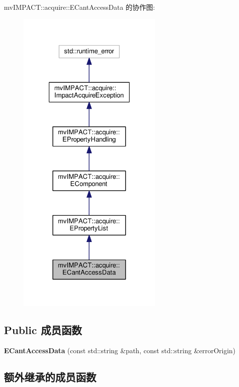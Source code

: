 mv\+I\+M\+P\+A\+C\+T\+:\+:acquire\+:\+:E\+Cant\+Access\+Data 的协作图\+:
\nopagebreak
\begin{figure}[H]
\begin{center}
\leavevmode
\includegraphics[width=202pt]{classmv_i_m_p_a_c_t_1_1acquire_1_1_e_cant_access_data__coll__graph}
\end{center}
\end{figure}
\subsection*{Public 成员函数}
\begin{DoxyCompactItemize}
\item 
\hypertarget{classmv_i_m_p_a_c_t_1_1acquire_1_1_e_cant_access_data_ab9098d5052f05a0accccb97097ee0749}{{\bfseries E\+Cant\+Access\+Data} (const std\+::string \&path, const std\+::string \&error\+Origin)}\label{classmv_i_m_p_a_c_t_1_1acquire_1_1_e_cant_access_data_ab9098d5052f05a0accccb97097ee0749}

\end{DoxyCompactItemize}
\subsection*{额外继承的成员函数}


